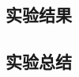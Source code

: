 \documentclass{ds201}
\begin{document}
\subsection{实验结果}

\subsection{实验总结}









\end{document}
